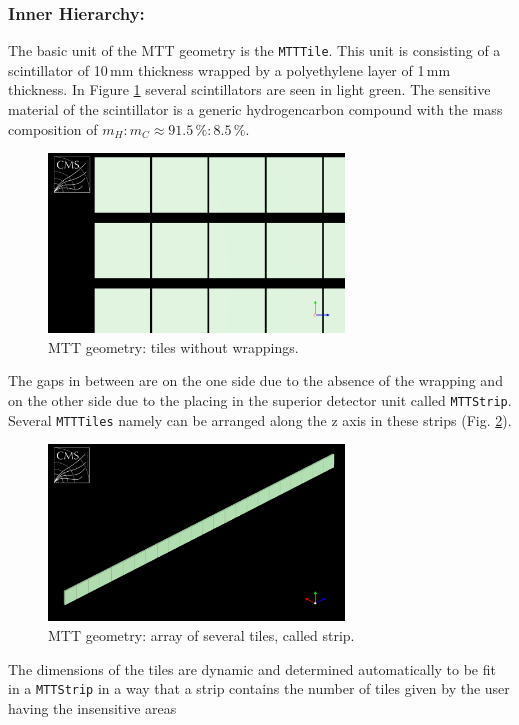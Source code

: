 			\subsubsection*{Inner Hierarchy:}
			The basic unit of the MTT geometry is the \verb+MTTTile+.
			This unit is consisting of a scintillator of 10\,mm thickness wrapped by a polyethylene layer of 1\,mm thickness.
			In Figure \ref{fig:tile_wowrapping} several scintillators are seen in light green.
			The sensitive material of the scintillator is a generic hydrogencarbon compound with the mass composition of $m_H:m_C \approx 91.5\,\%:8.5\,\%$.
			\begin{figure}[htbp]
				\centering
				\includegraphics[width=0.70\textwidth]{Figures/erdogan/tile_wowrapping.png}
				\caption{MTT geometry: tiles without wrappings.}
				\label{fig:tile_wowrapping}
			\end{figure}
			The gaps in between are on the one side due to the absence of the wrapping and on the other side due to the placing in the superior detector unit called \verb+MTTStrip+.
			Several \verb+MTTTiles+ namely can be arranged along the z axis in these strips (Fig. \ref{fig:strip}).
			\begin{figure}[htbp]
				\centering
				\includegraphics[width=0.70\textwidth]{Figures/erdogan/strip.png}
				\caption{MTT geometry: array of several tiles, called strip.}
				\label{fig:strip}
			\end{figure}
			The dimensions of the tiles are dynamic and determined automatically to be fit in a \verb+MTTStrip+ in a way that a strip contains the number of tiles given by the user having the insensitive areas
